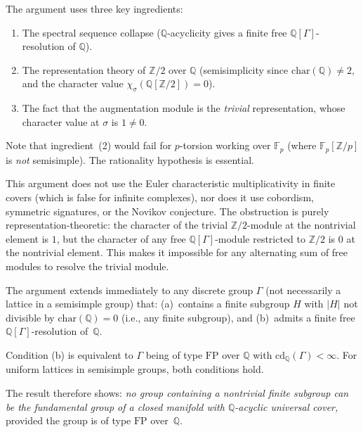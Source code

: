 \begin{remark}
The argument uses three key ingredients:
\begin{enumerate}
\item The spectral sequence collapse ($\mathbb{Q}$-acyclicity gives a finite
free $\mathbb{Q}[\Gamma]$-resolution of $\mathbb{Q}$).
\item The representation theory of $\mathbb{Z}/2$ over $\mathbb{Q}$
(semisimplicity since $\mathrm{char}(\mathbb{Q})\ne 2$, and the character
value $\chi_\sigma(\mathbb{Q}[\mathbb{Z}/2])=0$).
\item The fact that the augmentation module is the \emph{trivial}
representation, whose character value at $\sigma$ is $1\ne 0$.
\end{enumerate}
Note that ingredient~(2) would fail for $p$-torsion working over
$\mathbb{F}_p$ (where $\mathbb{F}_p[\mathbb{Z}/p]$ is \emph{not} semisimple).
The rationality hypothesis is essential.
\end{remark}

\begin{remark}
This argument does not use the Euler characteristic multiplicativity in finite
covers (which is false for infinite complexes), nor does it use cobordism,
symmetric signatures, or the Novikov conjecture. The obstruction is purely
representation-theoretic: the character of the trivial $\mathbb{Z}/2$-module
at the nontrivial element is $1$, but the character of any free
$\mathbb{Q}[\Gamma]$-module restricted to $\mathbb{Z}/2$ is $0$ at the
nontrivial element. This makes it impossible for any alternating sum of free
modules to resolve the trivial module.
\end{remark}

\begin{remark}[Generality]
The argument extends immediately to any discrete group $\Gamma$ (not necessarily
a lattice in a semisimple group) that:
(a)~contains a finite subgroup $H$ with $|H|$ not divisible by
$\mathrm{char}(\mathbb{Q})=0$ (i.e., any finite subgroup), and
(b)~admits a finite free $\mathbb{Q}[\Gamma]$-resolution of~$\mathbb{Q}$.

Condition (b) is equivalent to $\Gamma$ being of type $\mathrm{FP}$ over
$\mathbb{Q}$ with $\mathrm{cd}_\mathbb{Q}(\Gamma)<\infty$. For uniform
lattices in semisimple groups, both conditions hold.

The result therefore shows: \textit{no group containing a nontrivial finite
subgroup can be the fundamental group of a closed manifold with
$\mathbb{Q}$-acyclic universal cover,} provided the group is of type
$\mathrm{FP}$ over~$\mathbb{Q}$.
\end{remark}

